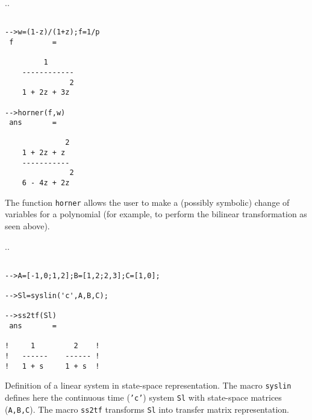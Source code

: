 \noindent.\dotfill.
\begin{verbatim}
 
-->w=(1-z)/(1+z);f=1/p
 f         =
 
         1        
    ------------  
               2  
    1 + 2z + 3z   
 
-->horner(f,w)
 ans       =
 
              2   
    1 + 2z + z    
    -----------   
               2  
    6 - 4z + 2z   
\end{verbatim}  
The function {\tt horner} allows the
user to make a (possibly symbolic) change of variables for a polynomial (for example, to
perform the bilinear transformation as seen above).

\noindent.\dotfill.
\begin{verbatim}
 
-->A=[-1,0;1,2];B=[1,2;2,3];C=[1,0];
 
-->Sl=syslin('c',A,B,C);
 
-->ss2tf(Sl)
 ans       =
 
!     1         2    !
!   ------    ------ !
!   1 + s     1 + s  !

\end{verbatim}
Definition of a linear system in state-space representation.
The macro {\tt syslin} defines here the continuous time ({\tt 'c'}) system
{\tt Sl} with state-space matrices ({\tt A,B,C}). The macro
{\tt ss2tf} transforms {\tt Sl} into transfer matrix representation.

